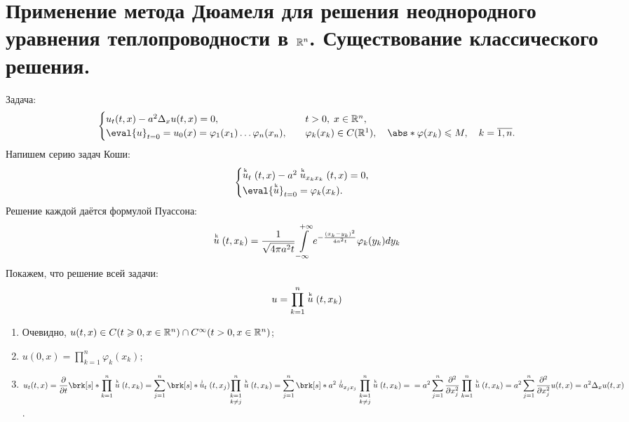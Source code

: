 \section{Применение метода Дюамеля для решения неоднородного уравнения теплопроводности в $\mathbb{R}^n$. Существование классического решения.}
Задача:
\begin{equation} \label{12_1}
\begin{cases}
	u_t(t,x) - a^2\Delta_xu(t,x) = 0, \quad & t > 0, \; x \in \R^n, \\
    \eval{u}_{t=0} = u_0(x) = \varphi_1(x_1) \ldots \varphi_n(x_n), \quad & \varphi_k(x_k) \in C(\R^1), \quad \abs*{\varphi(x_k)} \leqslant M, \quad k = \overline{1,n}.
\end{cases}
\end{equation}
Напишем серию задач Коши:
\def \uk {\stackrel{\text{\tiny{k}}}{u}}
\def \uj {\stackrel{\text{\tiny{j}}}{u}}
\begin{equation}
\begin{cases}
	\uk_t(t,x) - a^2\uk_{x_kx_k}(t,x) = 0, \\
    \eval{\uk}_{t=0} = \varphi_k(x_k).
\end{cases}
\end{equation}
Решение каждой даётся формулой Пуассона:
\begin{equation}
	\uk(t,x_k) = \dfrac{1}{\sqrt{4\pi a^2t}} \int\limits_{-\infty}^{+\infty} e^{-\frac{(x_k - y_k)^2}{4a^2t}}\varphi_k(y_k)dy_k
\end{equation}
Покажем, что решение всей задачи:
\begin{equation*}
	u = \prod_{k=1}^n \uk(t,x_k)
\end{equation*}
\begin{enumerate}
	\item Очевидно, $u(t,x) \in C(t \geqslant 0, x \in \mathbb{R}^n) \cap C^\infty(t > 0, x \in \mathbb{R}^n)$;
    \item $u(0,x) = \displaystyle\prod_{k=1}^n \varphi_k(x_k)$;
    \item $u_t(t,x) = \dfrac{\partial}{\partial t} \brk[s]*{\displaystyle\prod_{k=1}^n \uk(t,x_k)} = \displaystyle\sum_{j=1}^n \brk[s]*{\uj_t(t,x_j) \displaystyle\underset{k \not= j}{\prod_{k=1}^n} \uk(t,x_k)} = \displaystyle\sum_{j=1}^n \brk[s]*{a^2 \uj_{x_jx_j} \displaystyle\underset{k \not= j}{\prod_{k=1}^n} \uk(t,x_k)} = \\ = a^2 \displaystyle\sum_{j=1}^n \dfrac{\partial^2}{\partial x_j^2} \displaystyle\prod_{k=1}^n \uk(t,x_k) = a^2 \displaystyle \sum_{j=1}^n \dfrac{\partial^2}{\partial x_j^2} u(t,x) = a^2 \Delta_x u(t,x)$.
\end{enumerate}
